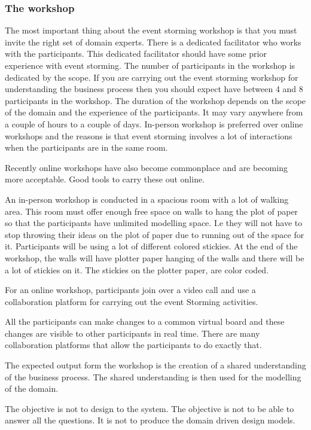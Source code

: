 \documentclass[a4paper, 11pt]{book}
\begin{document}
    \subsubsection{The workshop}
    The most important thing about the event storming workshop is that you must invite the right set of domain experts.
    There is a dedicated facilitator who works with the participants.
    This dedicated facilitator should have some prior experience with event storming.
    The number of participants in the workshop is dedicated by the scope.
    If you are carrying out the event storming workshop for understanding the business process then you should expect have between 4 and 8 participants in the workshop.
    The duration of the workshop depends on the scope of the domain and the experience of the participants.
    It may vary anywhere from a couple of hours to a couple of days.
    In-person workshop is preferred over online workshops and the reasons is that event storming involves a lot of interactions when the participants are in the same room.

    Recently online workshops have also become commonplace and are becoming more acceptable.
    Good tools to carry these out online.

    An in-person workshop is conducted in a spacious room with a lot of walking area.
    This room must offer enough free space on walls to hang the plot of paper so that the participants have unlimited modelling space.
    I.e they will not have to stop throwing their ideas on the plot of paper due to running out of the space for it.
    Participants will be using a lot of different colored stickies.
    At the end of the workshop, the walls will have plotter paper hanging of the walls and there will be a lot of stickies on it.
    The stickies on the plotter paper, are color coded.

    For an online workshop, participants join over a video call and use a collaboration platform for carrying out the event Storming activities.

    All the participants can make changes to a common virtual board and these changes are visible to other participants in real time.
    There are many collaboration platforms that allow the participants to do exactly that.

    The expected output form the workshop is the creation of a shared understanding of the business process.
    The shared understanding is then used for the modelling of the domain.

    The objective is not to design to the system.
    The objective is not to be able to answer all the questions.
    It is not to produce the domain driven design models.
\end{document}
